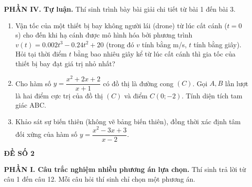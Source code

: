 \documentclass[12pt]{article}
\begin{document}
	\vspace{4mm}
	\noindent\textbf{PHẦN IV. Tự luận.} Thí sinh trình bày bài giải chi tiết từ bài 1 đến bài 3.
	\vspace{2mm}
	
	
	\begin{enumerate}[label=\textbf{Bài \arabic*.}, leftmargin=*]
		
		\item Vận tốc của một thiết bị bay không người lái (drone) từ lúc cất cánh ($t=0$ s) cho đến khi hạ cánh được mô hình hóa bởi phương trình $v(t) = 0.002t^3 - 0.24t^2 + 20$ (trong đó $v$ tính bằng m/s, $t$ tính bằng giây). Hỏi tại thời điểm $t$ bằng bao nhiêu giây kể từ lúc cất cánh thì gia tốc của thiết bị bay đạt giá trị nhỏ nhất?
		
		\vspace{2mm}
		\item Cho hàm số $y = \dfrac{x^2 + 2x + 2}{x + 1}$ có đồ thị là đường cong $(C)$. Gọi $A, B$ lần lượt là hai điểm cực trị của đồ thị $(C)$ và điểm $C(0; -2)$. Tính diện tích tam giác ABC.
		
		\vspace{2mm}
		\item Khảo sát sự biến thiên (không vẽ bảng biến thiên), đồng thời xác định tâm đối xứng của hàm số $y = \dfrac{x^2 - 3x + 3}{x - 2}$. \\
		
	\end{enumerate}
	
	
	\newpage %
	\begin{center}
		{\LARGE \textbf{ĐỀ SỐ 2}}\\[4pt]
	\end{center}
	\vspace{4mm}
	
	\noindent\textbf{PHẦN I. Câu trắc nghiệm nhiều phương án lựa chọn.} Thí sinh trả lời từ câu 1 đến câu 12. Mỗi câu hỏi thí sinh chỉ chọn một phương án.
	\vspace{2mm}
	
\end{document}
